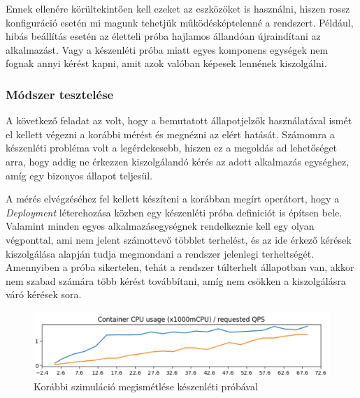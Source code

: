 Ennek ellenére körültekintően kell ezeket az eszközöket is használni, hiszen rossz konfiguráció esetén mi magunk tehetjük működésképtelenné a rendszert.
Például, hibás beállítás esetén az életteli próba hajlamos állandóan újraindítani az alkalmazást. Vagy a készenléti próba miatt egyes komponens egységek nem fognak annyi kérést kapni, amit azok valóban képesek lennének kiszolgálni.

\subsubsection{Módszer tesztelése}
A következő feladat az volt, hogy a bemutatott állapotjelzők használatával ismét el kellett végezni a korábbi mérést és megnézni az elért hatását.
Számomra a készenléti probléma volt a legérdekesebb, hiszen ez a megoldás ad lehetőséget arra, hogy addig ne érkezzen kiszolgálandó kérés az adott alkalmazás egységhez, amíg egy bizonyos állapot teljesül.

A mérés elvégzéséhez fel kellett készíteni a korábban megírt operátort, hogy a \textit{Deployment} léterehozása közben egy készenléti próba definiciót is építsen bele. 
Valamint minden egyes alkalmazásegységnek rendelkeznie kell egy olyan végponttal, ami nem jelent számottevő többlet terhelést, és az ide érkező kérések kiszolgálása alapján tudja megmondani a rendszer jelenlegi terheltségét. 
Amennyiben a próba sikertelen, tehát a rendszer túlterhelt állapotban van, akkor nem szabad számára több kérést továbbítani, amíg nem csökken a kiszolgálásra váró kérések sora.

\begin{figure}[!ht]
\centering
\includegraphics[width=150mm, keepaspectratio]{figures/multiFE-singleBE-readinessprobe.png}
\caption{Korábbi szimuláció megismétlése készenléti próbával}
\label{fig:readiness-probe-measurement}
\end{figure}


